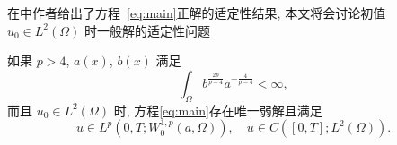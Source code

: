 \documentclass[oneside,longtitle]{LZUthesis}
\numberwithin{equation}{chapter}
\newcommand*\abs[1]{\lvert#1\rvert}
\begin{document}
在\cite{Zhan2019Uniquenessa}中作者给出了方程~\eqref{eq:main}正解的适定性结果,
本文将会讨论初值 $u_0 \in L^2(\Omega)$ 时一般解的适定性问题
\begin{theorem}\label{thm:absorb}
	如果 $p>4$, $a(x)$, $b(x)$ 满足
	\begin{equation}\label{initial_data_condition_tmp}
		\int_{\Omega} b^{\frac{2p}{p-4}}a^{-\frac{4}{p-4}} < \infty,
	\end{equation}
	而且 $u_0 \in L^2(\Omega) $ 时, 方程\eqref{eq:main}存在唯一弱解且满足
	\begin{equation*}
		u \in L^p(0, T; W_0^{1,p}(a,\Omega)), \quad u \in C([0, T]; L^2(\Omega)).
	\end{equation*}
\end{theorem}
\end{document}
